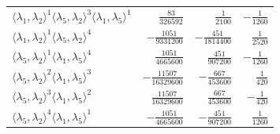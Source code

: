 \begin{longtable}{@{}lrrr@{}}
$\langle\lambda_1,\lambda_2\rangle^{1}\langle\lambda_5,\lambda_2\rangle^{3}\langle\lambda_1,\lambda_5\rangle^{1}$ & $\frac{83}{326592}$ & $\frac{1}{2100}$ & $-\frac{1}{1260}$ \\
$\langle\lambda_1,\lambda_2\rangle^{1}\langle\lambda_5,\lambda_2\rangle^{4}$ & $-\frac{1051}{9331200}$ & $-\frac{451}{1814400}$ & $\frac{1}{2520}$ \\
$\langle\lambda_5,\lambda_2\rangle^{1}\langle\lambda_1,\lambda_5\rangle^{4}$ & $\frac{1051}{4665600}$ & $\frac{451}{907200}$ & $-\frac{1}{1260}$ \\
$\langle\lambda_5,\lambda_2\rangle^{2}\langle\lambda_1,\lambda_5\rangle^{3}$ & $-\frac{11507}{16329600}$ & $-\frac{667}{453600}$ & $\frac{1}{420}$ \\
$\langle\lambda_5,\lambda_2\rangle^{3}\langle\lambda_1,\lambda_5\rangle^{2}$ & $\frac{11507}{16329600}$ & $\frac{667}{453600}$ & $-\frac{1}{420}$ \\
$\langle\lambda_5,\lambda_2\rangle^{4}\langle\lambda_1,\lambda_5\rangle^{1}$ & $-\frac{1051}{4665600}$ & $-\frac{451}{907200}$ & $\frac{1}{1260}$ \\
\end{longtable}
